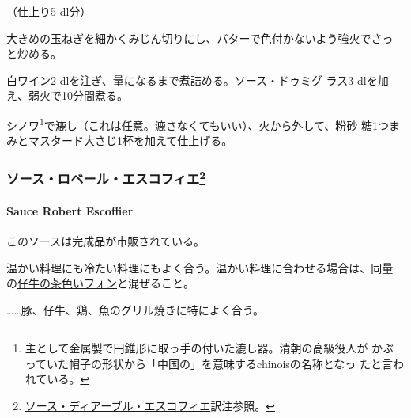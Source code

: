 \begin{recette}
（仕上り5 dl分）

大きめの玉ねぎを細かくみじん切りにし、バターで色付かないよう強火でさっ
と炒める。

白ワイン2
dlを注ぎ、\untiers{}量になるまで煮詰める。\protect\hyperlink{sauce-demi-glace}{ソース・ドゥミグ
ラス}3 dlを加え、弱火で10分間煮る。

シノワ\footnote{主として金属製で円錐形に取っ手の付いた漉し器。清朝の高級役人が
  かぶっていた帽子の形状から「中国の」を意味するchinoisの名称となっ
  たと言われている。}で漉し（これは任意。漉さなくてもいい）、火から外して、粉砂
糖1つまみとマスタード大さじ1杯を加えて仕上げる。

\maeaki

\hypertarget{ux30bdux30fcux30b9ux30edux30d9ux30fcux30ebux30a8ux30b9ux30b3ux30d5ux30a3ux30a879}{%
\subsubsection[ソース・ロベール・エスコフィエ]{\texorpdfstring{ソース・ロベール・エスコフィエ\footnote{\protect\hyperlink{sauce-diable-escoffier}{ソース・ディアーブル・エスコフィエ}訳注参照。}}{ソース・ロベール・エスコフィエ}}\label{ux30bdux30fcux30b9ux30edux30d9ux30fcux30ebux30a8ux30b9ux30b3ux30d5ux30a3ux30a879}}

\hypertarget{sauce-robert-escoffier}{%
\paragraph{Sauce Robert Escoffier}\label{sauce-robert-escoffier}}


このソースは完成品が市販されている。

温かい料理にも冷たい料理にもよく合う。温かい料理に合わせる場合は、同量
の\protect\hyperlink{fonds-de-veau-brun}{仔牛の茶色いフォン}と混ぜること。

\ldots{}\ldots{}豚、仔牛、鶏、魚のグリル焼きに特によく合う。

\maeaki

\hypertarget{ux30edux30fcux30deux98a880ux30bdux30fcux30b9}{%
}
\end{recette}
